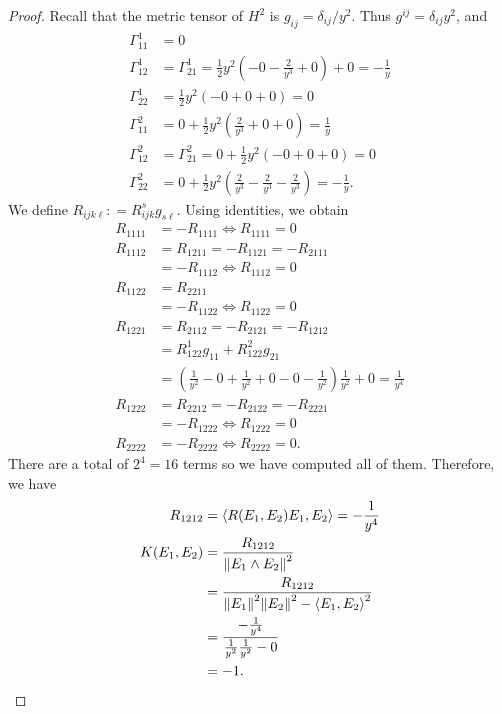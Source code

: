 \documentclass[12pt]{article}
\begin{document}
\begin{proof}
Recall that the metric tensor of $ H^2$ is $ g_{ij} = \delta_{ij} /y^2$. Thus $ g^{ij} = \delta_{ij} y^2$, and 
\begin{align*}
	\Gamma_{ 1 1}^{ 1} &= 0 \\
	\Gamma_{ 1 2}^{ 1} &= \Gamma_{ 2 1}^{ 1}  = \frac{1}{2} y^2\left(-0 - \frac{2}{y^3} + 0  \right) +0  = -\frac{1}{y}\\
	\Gamma_{ 2 2}^{ 1} &= \frac{1}{2} y^2 \left( -0 + 0 + 0 \right) = 0  \\
	\Gamma_{ 1 1}^{ 2} &= 0+\frac{1}{2} y^2 \left( \frac{2}{y^3} +0 + 0 \right) = \frac{1}{y}  \\
	\Gamma_{ 1 2}^{ 2} &= \Gamma_{ 2 1}^{ 2} = 0+ \frac{1}{2} y^2 \left( -0 +0 +0 \right) = 0\\
	\Gamma_{ 2 2}^{ 2} &= 0+ \frac{1}{2} y^2 \left( \frac{2}{y^3} - \frac{2}{y^3} - \frac{2}{y^3} \right)  = -\frac{1}{y} .
\end{align*}
We define $ R_{ijk\ell} : = R_{ijk}^{s} g_{s\ell}$. Using identities, we obtain
\begin{align*}
	R_{1111} &= - R_{1111} \iff R_{1111} = 0 \\
	R_{1112} &= R_{1211} =-R_{1121} = -R_{2111} \\
	&= -R_{1112} \iff R_{1112}= 0  \\
	R_{1122} &= R_{2211}  \\
	&= -R_{1122} \iff R_{1122} =0 \\
	R_{1221} &= R_{2112} = -R_{2121} = -R_{1212} \\
	&= R_{122}^{1} g_{11} + R_{122}^{2} g_{21} \\
		    &= \left( \frac{1}{y^2} -0+ \frac{1}{y^2} +0-0- \frac{1}{y^2} \right) \frac{1}{y^2} +0  = \frac{1}{y^{4}}\\
	R_{1222} &= R_{2212} = -R_{2122} = -R_{2221}  \\
	&= -R_{1222} \iff R_{1222}=0 \\
	R_{2222} &= -R_{2222} \iff R_{2222} = 0 .
\end{align*}
There are a total of $ 2^{4} = 16$ terms so we have computed all of them. Therefore, we have
\begin{align*}
	R_{1212} &= \left\langle R(E_1,E_2)E_1 , E_2 \right\rangle = -\frac{1}{y^{4}}\\
	K(E_1,E_2) &= \frac{R_{1212}}{ {\left\lVert{ E_1 \wedge E_2}\right\rVert}^2 }\\ 
		 &= \frac{R_{1212}}{ {\left\lVert{ E_1}\right\rVert}^2 {\left\lVert{ E_2}\right\rVert}^2 -  \left\langle E_1, E_2 \right\rangle^2 }  \\
		 &= \frac{-\frac{1}{y^{4}}}{ \frac{1}{y^2} \frac{1}{y^2} -0} \\
		 &=- 1 .
\end{align*}
\end{proof}
\end{document}
